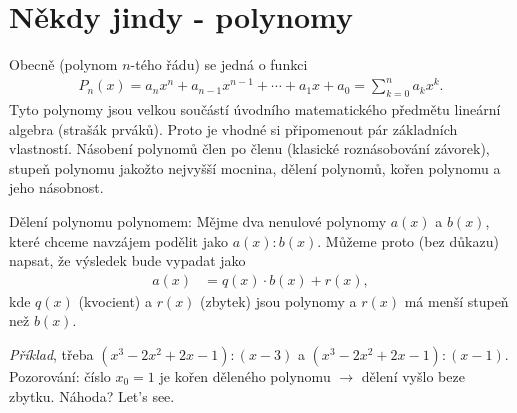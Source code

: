 \documentclass[11pt,a4paper]{article}
\begin{document}
        

        




        
\newpage
        \section*{Někdy jindy - polynomy}
            Obecně (polynom $n$-tého řádu) se jedná o funkci
                \begin{align*}
                    P_n(x) = a_n x^n + a_{n-1} x^{n-1} + \cdots + a_1 x + a_0 = \sum_{k=0}^n a_k x^k.
                \end{align*}
            Tyto polynomy jsou velkou součástí úvodního matematického předmětu lineární algebra (strašák prváků). Proto je vhodné si připomenout pár základních vlastností. Násobení polynomů člen po členu (klasické roznásobování závorek), stupeň polynomu jakožto nejvyšší mocnina, dělení polynomů, kořen polynomu a jeho násobnost.

            Dělení polynomu polynomem: Mějme dva nenulové polynomy $a(x)$ a $b(x)$, které chceme navzájem podělit jako $a(x) : b(x)$. Můžeme proto (bez důkazu) napsat, že výsledek bude vypadat jako
            \begin{align*}
                a(x) &= q(x) \cdot b(x) + r(x),
            \end{align*}
            kde $q(x)$ (kvocient) a $r(x)$ (zbytek) jsou polynomy a $r(x)$ má menší stupeň než $b(x)$.

            \noindent \emph{Příklad}, třeba $(x^3 - 2x^2 + 2x - 1):(x-3)$ a $(x^3 - 2x^2 + 2x - 1):(x-1)$. Pozorování: číslo $x_0 = 1$ je kořen děleného polynomu $\to$ dělení vyšlo beze zbytku. Náhoda? Let's see.
\end{document}
